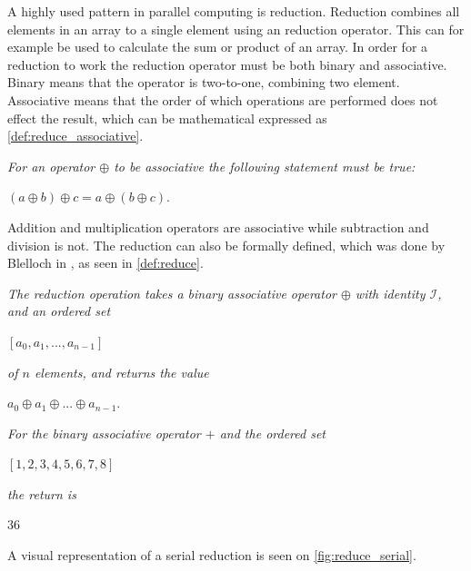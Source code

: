 A highly used pattern in parallel computing is reduction. Reduction combines all elements in an array to a single element using an reduction operator. This can for example be used to calculate the sum or product of an array. In order for a reduction to work the reduction operator must be both binary and associative. Binary means that the operator is two-to-one, combining two element. Associative means that the order of which operations are performed does not effect the result, which can be mathematical expressed as \cref{def:reduce_associative}.

\begin{definition} 
\label{def:reduce_associative}
\textit{For an operator $\oplus$ to be associative the following statement must be true:}
\begin{center}
	$(a \oplus b) \oplus c = a \oplus (b \oplus c).$
\end{center}
\end{definition}

\noindent Addition and multiplication operators are associative while subtraction and division is not. The reduction can also be formally defined, which was done by Blelloch in \cite{BlellochTR90}, as seen in \cref{def:reduce}.

\begin{definition} 
	\label{def:reduce}
	\textit{The reduction operation takes a binary associative operator $\oplus$ with identity $\mathcal{I}$, and an ordered set}
	\begin{center}
		$[a_0, a_1,...,a_{n-1}]$ 
	\end{center}
	\textit{of $n$ elements, and returns the value}
	\begin{center}
		$a_0 \oplus a_1 \oplus ... \oplus a_{n-1}.$
	\end{center}
\end{definition}
\begin{example}
	\textit{For the binary associative operator $+$ and the ordered set}
	\begin{center}
		$[1,2,3,4,5,6,7,8]$ 
	\end{center}
	\textit{the return is}
	\begin{center}
		$36$
	\end{center}
	\end{example}

A visual representation of a serial reduction is seen on \cref{fig:reduce_serial}. 

